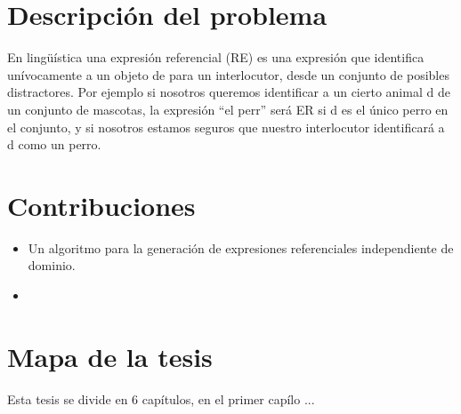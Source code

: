 
\section{Descripci\'on del problema}


En ling\"u\'{i}stica una expresi\'on referencial (RE) es una expresi\'on que identifica un\'{i}vocamente a un objeto de para un interlocutor, desde un conjunto de posibles distractores. Por ejemplo si nosotros queremos identificar a un cierto animal d de un conjunto de mascotas, la expresi\'on ``el perr'' ser\'a ER si d es el \'unico perro en el conjunto, y si nosotros estamos seguros que nuestro interlocutor identificar\'a a d como un perro.


\section{Contribuciones}

\begin{itemize}
 \item Un algoritmo para la generaci\'on de expresiones referenciales independiente de dominio.
 \item
\end{itemize}

\section{Mapa de la tesis}
Esta tesis se divide en 6 cap\'{i}tulos, en el primer cap\'{i}lo ...

